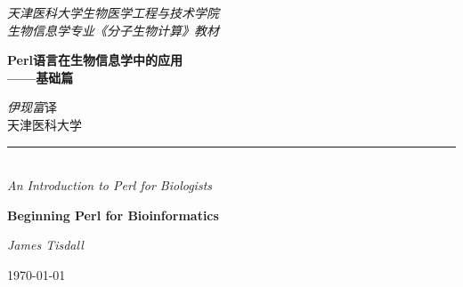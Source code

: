 \begin{titlepage}
  \begin{center}


    { \Large \itshape 天津医科大学\qquad 生物医学工程与技术学院}\\
    { \Large \itshape 生物信息学专业\qquad 《分子生物计算》教材}\\

    \vspace*{3cm}

    { \Huge \bfseries Perl语言在生物信息学中的应用\\}
    { \Huge \bfseries ——基础篇 \\[0.5cm] }

    \noindent
    \begin{flushright}
    \LARGE
    \textit{伊现富}\qquad 译\\
    天津医科大学
    \end{flushright}

    \vspace*{1cm}
    \rule{\linewidth}{0.5mm} \\[1.5cm]

    { \Large \itshape An Introduction to Perl for Biologists}\\
    \vspace*{1.5cm}

    { \Huge \bfseries Beginning Perl for Bioinformatics\\}
    \noindent
    \begin{flushright}
    \LARGE
    \textit{James Tisdall}\\
    \end{flushright}

    \vfill

    {\Large \today}

  \end{center}
  
  \newpage
  \null
  \thispagestyle{empty}
  \newpage
\end{titlepage}

